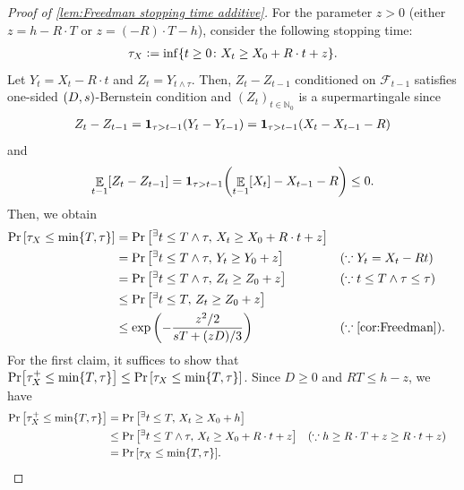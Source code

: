 \documentclass[letterpaper,11pt]{article}
\def\defeq{\mathrel{\mathop:}=}
\DeclarePairedDelimiter{\rbra}{\lparen}{\rparen} %
\DeclarePairedDelimiter{\cbra}{\lbrace}{\rbrace} %
\DeclarePairedDelimiter{\sbra}{\lbrack}{\rbrack} %
\newcommand{\indicator}{\mathbf{1}}
\DeclareMathOperator*{\E}{\mathbb{E}}
\renewcommand{\epsilon}{\varepsilon}
\newcommand{\Nat}{\mathbb{N}}
\newcommand{\bounded}{D}
\newcommand{\variance}{s}
\newcommand{\drift}{R}
\newcommand{\tinyexists}{{}^{\exists}}
\newcommand{\taux}{\tau_X}
\newcommand{\tauxplus}{\tau_X^+}
\begin{document}
  \begin{proof}[Proof of \cref{lem:Freedman stopping time additive}]
    For the parameter $z>0$ (either $ z=h-\drift\cdot T $ or $ z = (-\drift)\cdot T - h $), consider the following stopping time:
    \begin{align*} 
       \taux\defeq \inf\cbra*{t\geq 0\colon X_t\geq X_0+\drift\cdot t+z}.
    \end{align*}
      Let $Y_t=X_t-\drift\cdot t$ and $Z_t=Y_{t\wedge \tau}$.
      Then, $Z_t-Z_{t-1}$ conditioned on $\mathcal{F}_{t-1}$ satisfies one-sided $\qty(\bounded,\variance)$-Bernstein condition and
      $(Z_t)_{t\in \Nat_0}$ is a supermartingale since
      \begin{align*}
      Z_t-Z_{t-1}
      =\indicator_{\tau>t-1}\rbra*{Y_t-Y_{t-1}}
      =\indicator_{\tau>t-1}\rbra*{X_t-X_{t-1}-\drift}
      \end{align*}
      and
      \begin{align*}
        \E_{t-1}\sbra*{Z_t-Z_{t-1}}
        =\indicator_{\tau>t-1}\rbra*{\E_{t-1}[X_t]-X_{t-1}-\drift}
        \leq 0.
      \end{align*}
      Then, 
      we obtain
      \begin{align*}
        \Pr\qty[\tau_X \le \min\{T,\tau\}] 
        &=\Pr\qty[\tinyexists t\le T\land \tau,\,X_t\geq X_0+\drift\cdot t+z ] \\
        &=\Pr\qty[\tinyexists t \le T \land \tau,\,Y_t\geq Y_0+z] &&(\because Y_t=X_t-Rt)\\
        &=\Pr\qty[\tinyexists t \le T\land \tau,\,Z_t\geq Z_0+z] &&(\because t\leq T\wedge \tau \leq \tau)\\
        &\le \Pr\qty[\tinyexists t \le T,\,Z_t\geq Z_0+z]\\
        &\le \exp\qty(- \frac{z^2/2}{\variance T + (z \bounded)/3}) &&(\because \textrm{\cref{cor:Freedman}}).
      \end{align*}
      For the first claim, it suffices to show that $\Pr[\tauxplus \le \min\{T,\tau\}] 
      \leq \Pr\qty[\tau_X \le \min\{T,\tau\}]$.
      Since $\bounded\geq 0$ and $\drift T\leq h-z$, we have
      \begin{align*}
        \Pr\qty[\tauxplus \le \min\{T,\tau\}] 
        &=\Pr\qty[\tinyexists t \le T,\,X_t\geq X_0+h]\\
        &\leq \Pr\qty[\tinyexists t \le T\land \tau,\,X_t\geq X_0+\drift\cdot t+z]&&(\because h\geq \drift\cdot T+z\geq \drift\cdot t+z)\\
        &=\Pr\qty[\tau_X \le \min\{T,\tau\}].
      \end{align*}
    

\end{proof}
\end{document}
